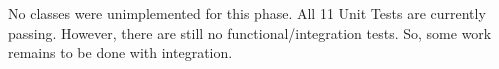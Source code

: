 No classes were unimplemented for this phase.  All 11 Unit Tests are currently passing.
However, there are still no functional/integration tests.  So, some work remains to be
done with integration.
